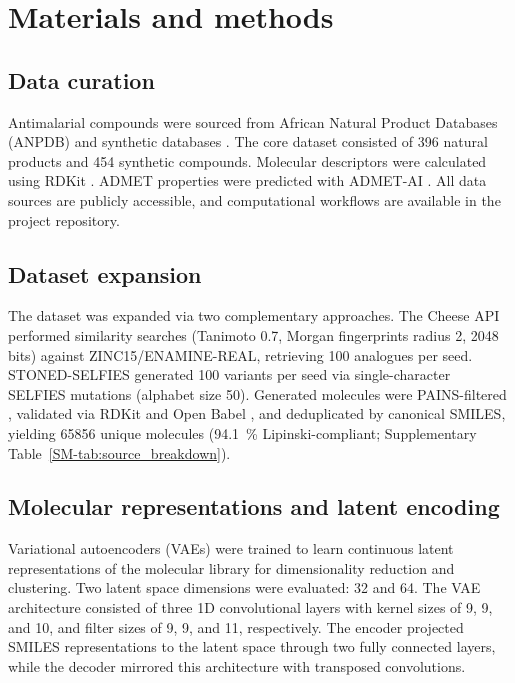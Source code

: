 \documentclass[journal=jcisd8,manuscript=article]{achemso}
\begin{document}
\section{Materials and methods}

\subsection{Data curation}

Antimalarial compounds were sourced from African Natural Product Databases (ANPDB) \cite{Sorokina2021,Onguene2018,NtieKang2017,Simoben2020} and synthetic databases \cite{Knox2023,Spangenberg2013}. The core dataset consisted of \num{396} natural products and \num{454} synthetic compounds. Molecular descriptors were calculated using RDKit \cite{GregLandrum2025}. ADMET properties were predicted with ADMET-AI \cite{Swanson2024}. All data sources are publicly accessible, and computational workflows are available in the project repository.

\subsection{Dataset expansion}

The dataset was expanded via two complementary approaches. The Cheese API \cite{lzicar_cheese_2024} performed similarity searches (Tanimoto \num{0.7}, Morgan fingerprints radius \num{2}, \num{2048} bits) against ZINC15/ENAMINE-REAL, retrieving \num{100} analogues per seed. STONED-SELFIES \cite{Nigam2021} generated \num{100} variants per seed via single-character SELFIES mutations (alphabet size \num{50}). Generated molecules were PAINS-filtered \cite{Baell2010}, validated via RDKit and Open Babel \cite{OBoyle2011}, and deduplicated by canonical SMILES, yielding \num{65856} unique molecules (\qty{94.1}{\percent} Lipinski-compliant; Supplementary Table~\ref{SM-tab:source_breakdown}).

\subsection{Molecular representations and latent encoding}

Variational autoencoders (VAEs) \cite{Kingma2013} were trained to learn continuous latent representations of the molecular library for dimensionality reduction and clustering. Two latent space dimensions were evaluated: \num{32} and \num{64}. The VAE architecture consisted of three 1D convolutional layers with kernel sizes of \num{9}, \num{9}, and \num{10}, and filter sizes of \num{9}, \num{9}, and \num{11}, respectively. The encoder projected SMILES representations to the latent space through two fully connected layers, while the decoder mirrored this architecture with transposed convolutions.
\end{document}
